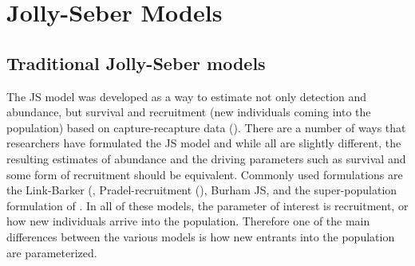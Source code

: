 \section{Jolly-Seber Models}

\subsection{Traditional Jolly-Seber models}

The JS model was developed as a way to estimate not only detection and
abundance, but survival and recruitment (new individuals coming into
the population) based on capture-recapture data (\cite{jolly:1965,
  seber:1965}).  There are a number of ways that researchers have
formulated the JS model \citep{cooch_white:2006} 
and while all are slightly different, the
resulting estimates of abundance and the driving parameters such as
survival and some form of recruitment should be equivalent. 
Commonly used formulations are the Link-Barker
(\citep{link_barker:2005}, Pradel-recruitment (\citep{pradel:1996}),
Burham JS, and the super-population formulation of
 \citet{schwarz_arnason:1996}.     %
In all of these
models, the parameter of interest is recruitment, or how new
individuals arrive into the population.  Therefore one of the main
differences between the various models is how new entrants into the
population are parameterized.


